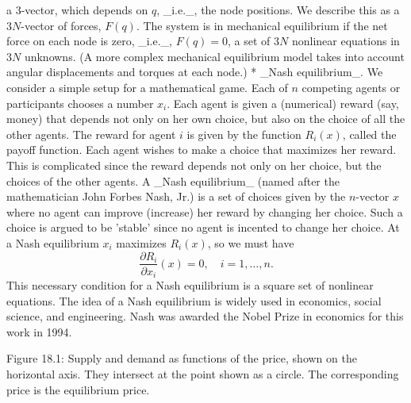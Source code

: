 a 3-vector, which depends on \(q\), _i.e._, the node positions. We describe this as a \(3N\)-vector of forces, \(F(q)\). The system is in mechanical equilibrium if the net force on each node is zero, _i.e._, \(F(q)=0\), a set of \(3N\) nonlinear equations in \(3N\) unknowns. (A more complex mechanical equilibrium model takes into account angular displacements and torques at each node.)
* _Nash equilibrium_. We consider a simple setup for a mathematical game. Each of \(n\) competing agents or participants chooses a number \(x_{i}\). Each agent is given a (numerical) reward (say, money) that depends not only on her own choice, but also on the choice of all the other agents. The reward for agent \(i\) is given by the function \(R_{i}(x)\), called the payoff function. Each agent wishes to make a choice that maximizes her reward. This is complicated since the reward depends not only on her choice, but the choices of the other agents. A _Nash equilibrium_ (named after the mathematician John Forbes Nash, Jr.) is a set of choices given by the \(n\)-vector \(x\) where no agent can improve (increase) her reward by changing her choice. Such a choice is argued to be 'stable' since no agent is incented to change her choice. At a Nash equilibrium \(x_{i}\) maximizes \(R_{i}(x)\), so we must have \[\frac{\partial R_{i}}{\partial x_{i}}(x)=0,\quad i=1,\ldots,n.\] This necessary condition for a Nash equilibrium is a square set of nonlinear equations. The idea of a Nash equilibrium is widely used in economics, social science, and engineering. Nash was awarded the Nobel Prize in economics for this work in 1994.

Figure 18.1: Supply and demand as functions of the price, shown on the horizontal axis. They intersect at the point shown as a circle. The corresponding price is the equilibrium price.

 